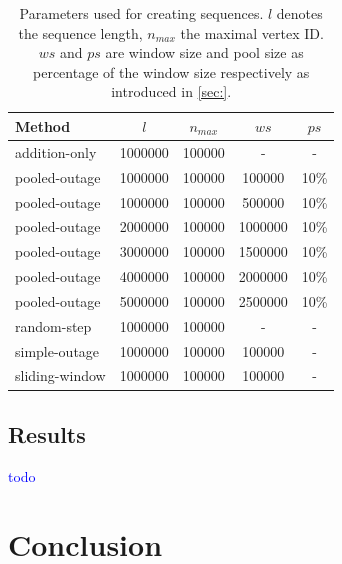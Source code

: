 \documentclass{article}      %
\newcommand\todo[1]{\textcolor{blue}{#1}}
\begin{document}
\begin{table}
  \centering
    \begin{tabular}{| l | c | c | c | c |}
    	\hline
    	Method & $l$ & $n_{max}$ & $ws$ & $ps$ \\
    	\hline
		addition-only & 1000000 & 100000 & - & - \\
		pooled-outage & 1000000 & 100000 & 100000 & 10\% \\
		pooled-outage & 1000000 & 100000 & 500000 & 10\% \\
		pooled-outage & 2000000 & 100000 & 1000000 & 10\% \\
		pooled-outage & 3000000 & 100000 & 1500000 & 10\% \\
		pooled-outage & 4000000 & 100000 & 2000000 & 10\% \\
		pooled-outage & 5000000 & 100000 & 2500000 & 10\% \\
		random-step & 1000000 & 100000 & - & - \\
		simple-outage & 1000000 & 100000 & 100000 & - \\
		sliding-window & 1000000 & 100000 & 100000 & - \\
    	\hline
    \end{tabular}
  	\caption{Parameters used for creating sequences. $l$ denotes the sequence length, $n_{max}$ the maximal vertex ID. $ws$ and $ps$ are window size and pool size as percentage of the window size respectively as introduced in \ref{sec:}.}
    \label{tab:seq-params}
\end{table}


\subsection{Results}
\label{sec:results}
\todo{todo}

\pagebreak
\section{Conclusion}
\label{sec:conclusion}

\pagebreak



\end{document}
